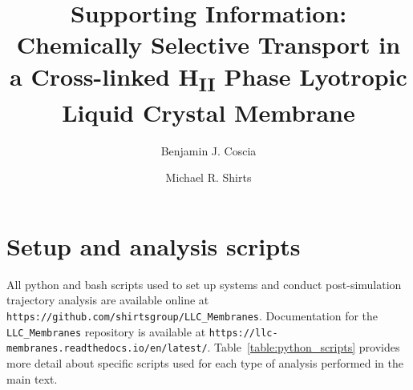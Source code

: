 \documentclass{article}
\title{Supporting Information: Chemically Selective Transport in a Cross-linked H\textsubscript{II} Phase Lyotropic Liquid Crystal Membrane}
\author{Benjamin J. Coscia \and Michael R. Shirts}
\begin{document}
  \maketitle
  \graphicspath{{./supporting_figures/}}
  

  \section{Setup and analysis scripts}\label{section:python_scripts}

  All python and bash scripts used to set up systems and conduct post-simulation trajectory
  analysis are available online at \texttt{https://github.com/shirtsgroup/LLC\_Membranes}.
  Documentation for the \texttt{LLC\_Membranes} repository is available at 
  \texttt{https://llc-membranes.readthedocs.io/en/latest/}. Table~\ref{table:python_scripts}
  provides more detail about specific scripts used for each type of analysis performed in
  the main text.
  
\end{document}
